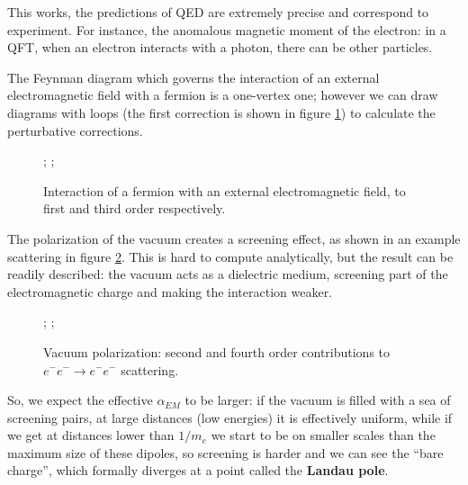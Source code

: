 \documentclass[main.tex]{subfiles}
\begin{document}
This works, the predictions of QED are extremely precise and correspond to experiment.
For instance, the anomalous magnetic moment of the electron: in a QFT, when an electron interacts with a photon, there can be other particles.

The Feynman diagram which governs the interaction of an external electromagnetic field with a fermion is a one-vertex one; however we can draw diagrams with loops (the first correction is shown in figure \ref{fig:fermion-external-EM-field-feynman-diagram}) to calculate the perturbative corrections.

\begin{figure}[ht]
\centering
{};
\qquad
{};
\caption{Interaction of a fermion with an external electromagnetic field, to first and third order respectively.}
\label{fig:fermion-external-EM-field-feynman-diagram}
\end{figure}

The polarization of the vacuum creates a screening effect, as shown in an example scattering in figure \ref{fig:vacuum-polarization-feynman-diagram}.
This is hard to compute analytically, but the result can be readily described: the vacuum acts as a dielectric medium, screening part of the electromagnetic charge and making the interaction weaker. 

\begin{figure}[ht]
\centering
{};
\qquad
{};
\caption{Vacuum polarization: second and fourth order contributions to \(e^{-}e^{-} \to e^{-}e^{-}\) scattering.}
\label{fig:vacuum-polarization-feynman-diagram}
\end{figure}

So, we expect the effective \(\alpha_{EM}\) to be larger: if the vacuum is filled with a sea of screening pairs, at large distances (low energies) it is effectively uniform, while if we get at distances lower than \(1/m_e\) we start to be on smaller scales than the maximum size of these dipoles, so screening is harder and we can see the ``bare charge'', which formally diverges at a point called the \textbf{Landau pole}.
\end{document}
